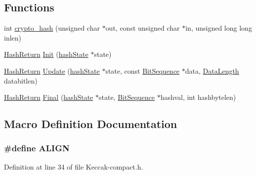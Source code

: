 \subsection*{Functions}
\begin{DoxyCompactItemize}
\item 
int \hyperlink{Keccak-compact_8h_a92cd4d0a323107c62536ab7bba8e5d6e}{crypto\-\_\-hash} (unsigned char $\ast$out, const unsigned char $\ast$in, unsigned long long inlen)
\item 
\hyperlink{Keccak-compact_8h_a8291024a9e890d5d4d60dc3c76d2b44c}{Hash\-Return} \hyperlink{Keccak-compact_8h_a1b8c8a006dfc4249184547e855352b24}{Init} (\hyperlink{Keccak-compact_8h_a6cd75f9e7106362b1576ff73d4cc6a3b}{hash\-State} $\ast$state)
\item 
\hyperlink{Keccak-compact_8h_a8291024a9e890d5d4d60dc3c76d2b44c}{Hash\-Return} \hyperlink{Keccak-compact_8h_afdec6f2494afd29ec80747223d1acf73}{Update} (\hyperlink{Keccak-compact_8h_a6cd75f9e7106362b1576ff73d4cc6a3b}{hash\-State} $\ast$state, const \hyperlink{Keccak-compact_8h_ac7449f64e35526a4e70f37cbc40ecc65}{Bit\-Sequence} $\ast$data, \hyperlink{Keccak-compact_8h_aa1c06fb4773a4b043c077daf86fb9d87}{Data\-Length} databitlen)
\item 
\hyperlink{Keccak-compact_8h_a8291024a9e890d5d4d60dc3c76d2b44c}{Hash\-Return} \hyperlink{Keccak-compact_8h_a0bc149d576bf1e0725f19cb49f3e23c0}{Final} (\hyperlink{Keccak-compact_8h_a6cd75f9e7106362b1576ff73d4cc6a3b}{hash\-State} $\ast$state, \hyperlink{Keccak-compact_8h_ac7449f64e35526a4e70f37cbc40ecc65}{Bit\-Sequence} $\ast$hashval, int hashbytelen)
\end{DoxyCompactItemize}


\subsection{Macro Definition Documentation}
\hypertarget{Keccak-compact_8h_ae4ff5a07c6ff43ed11a3887ef7d524f2}{
\subsubsection[{A\-L\-I\-G\-N}]{\setlength{\rightskip}{0pt plus 5cm}\#define A\-L\-I\-G\-N}}\label{Keccak-compact_8h_ae4ff5a07c6ff43ed11a3887ef7d524f2}


Definition at line 34 of file Keccak-\/compact.\-h.



